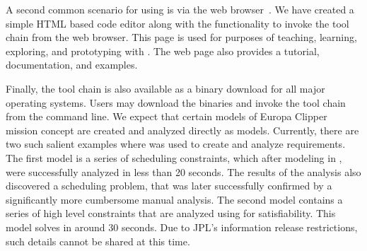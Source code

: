 A second common scenario for using \Klang{} is via the web
browser~\cite{kwebsite}. We have created a simple HTML based \Klang{}
code editor along with the functionality to invoke the \Klang{}
tool chain from the web browser. This page is used for purposes of
teaching, learning, exploring, and prototyping with \Klang{}. The web
page also provides a tutorial, documentation, and examples.

Finally, the \Klang{} tool chain is also available as a binary
download for all major operating systems. Users may download the
binaries and invoke the tool chain from the command line. We expect
that certain models of Europa Clipper mission concept are created and
analyzed directly as \Klang{} models. Currently, there are two such
salient examples where \Klang{} was used to create and analyze
requirements. The first model is a series of scheduling constraints,
which after modeling in \Klang{}, were successfully analyzed in less
than 20 seconds. The results of the analysis also discovered a
scheduling problem, that was later successfully confirmed by a
significantly more cumbersome manual analysis. The second model
contains a series of high level constraints that are analyzed using
\Klang{} for satisfiability. This model solves in around 30
seconds. Due to JPL's information release restrictions, such details
cannot be shared at this time.

